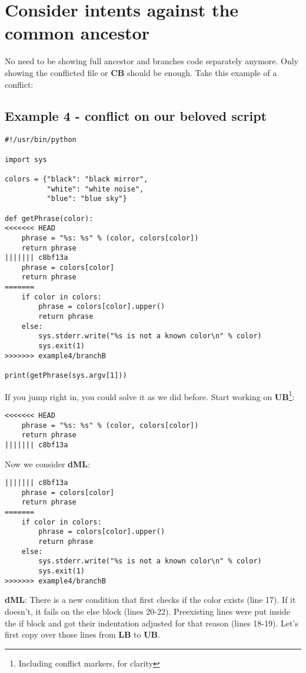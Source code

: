 
\section{Consider intents against the common ancestor}
No need to be showing full ancestor and branches code separately anymore. Only showing the conflicted file or {\bf CB} should
be enough. Take this example of a conflict:

\subsection{Example 4 - conflict on our beloved script}
\label{example_04}

\begin{lstlisting}[style=python_style, caption={\bf example 4}]
#!/usr/bin/python

import sys

colors = {"black": "black mirror",
          "white": "white noise",
          "blue": "blue sky"}

def getPhrase(color):
<<<<<<< HEAD
    phrase = "%s: %s" % (color, colors[color])
    return phrase
||||||| c8bf13a
    phrase = colors[color]
    return phrase
=======
    if color in colors:
        phrase = colors[color].upper()
        return phrase
    else:
        sys.stderr.write("%s is not a known color\n" % color)
        sys.exit(1)
>>>>>>> example4/branchB

print(getPhrase(sys.argv[1]))
\end{lstlisting}

If you jump right in, you could solve it as we did before. Start working on {\bf UB}\footnote{Including conflict markers, for clarity}:
\begin{lstlisting}[style=python_style, firstnumber=10, caption={\bf example 4} - Step 1 - UB]
<<<<<<< HEAD
    phrase = "%s: %s" % (color, colors[color])
    return phrase
||||||| c8bf13a
\end{lstlisting}

Now we consider {\bf dML}:
\begin{lstlisting}[style=python_style, firstnumber=13, caption={\bf example 4} - Step 2 - dML]
||||||| c8bf13a
    phrase = colors[color]
    return phrase
=======
    if color in colors:
        phrase = colors[color].upper()
        return phrase
    else:
        sys.stderr.write("%s is not a known color\n" % color)
        sys.exit(1)
>>>>>>> example4/branchB
\end{lstlisting}
{\bf dML}: There is a new condition that first checks if the color exists (line 17). If it doesn't, it fails on the else block (lines 20-22).
Preexisting lines were put inside the if block and got their indentation adjusted for that reason (lines 18-19). Let's first copy over
those lines from {\bf LB} to {\bf UB}.

